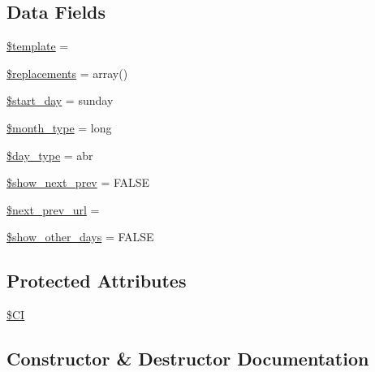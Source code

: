 \subsection*{Data Fields}
\begin{DoxyCompactItemize}
\item 
\hyperlink{class_c_i___calendar_aa3e9534005fd516d941f6a5569896e01}{\$template} = \textquotesingle{}\textquotesingle{}
\item 
\hyperlink{class_c_i___calendar_a93cb3f67ace379a71de4fb00bcc7a605}{\$replacements} = array()
\item 
\hyperlink{class_c_i___calendar_ac4e461505bb7cd9a2fdb2bf47560a389}{\$start\+\_\+day} = \textquotesingle{}sunday\textquotesingle{}
\item 
\hyperlink{class_c_i___calendar_ab40961ce0a0e4a7ee10ad389c9566b28}{\$month\+\_\+type} = \textquotesingle{}long\textquotesingle{}
\item 
\hyperlink{class_c_i___calendar_a1e35fdb6b6cc297a6bb256517a8d813d}{\$day\+\_\+type} = \textquotesingle{}abr\textquotesingle{}
\item 
\hyperlink{class_c_i___calendar_aeade2ffe515604c0dffb78d32ca846ae}{\$show\+\_\+next\+\_\+prev} = F\+A\+L\+S\+E
\item 
\hyperlink{class_c_i___calendar_a3ed0df912e3e67eb17d432c1f54ae2de}{\$next\+\_\+prev\+\_\+url} = \textquotesingle{}\textquotesingle{}
\item 
\hyperlink{class_c_i___calendar_a52c552ab98b51789690522ff7d41ecb7}{\$show\+\_\+other\+\_\+days} = F\+A\+L\+S\+E
\end{DoxyCompactItemize}
\subsection*{Protected Attributes}
\begin{DoxyCompactItemize}
\item 
\hyperlink{class_c_i___calendar_ae0314d046ddf7fcfaec03222977427d3}{\$\+C\+I}
\end{DoxyCompactItemize}


\subsection{Constructor \& Destructor Documentation}
\hypertarget{class_c_i___calendar_af7f9493844d2d66e924e3c1df51ce616}{}
